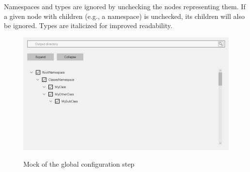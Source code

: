 Namespaces and types are ignored by unchecking the nodes representing them. If a given node with children (e.g., a namespace) is unchecked, its children will also be ignored. Types are italicized for improved readability.

\begin{figure}[H]
    \includegraphics[width=\linewidth]{img/mockGlobal settings.png}
    \label{fig:pluginGlobal}
    \caption{Mock of the global configuration step}
\end{figure}